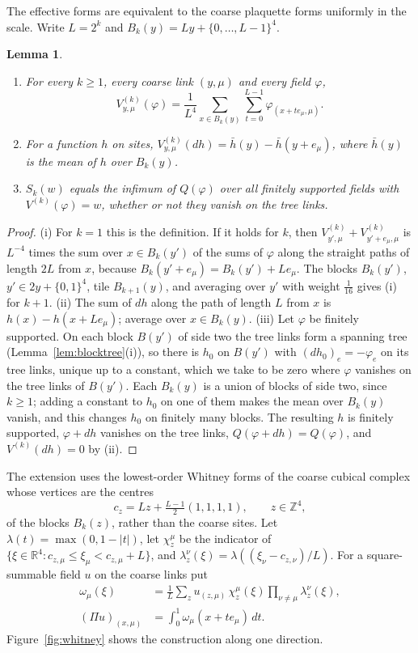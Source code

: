 \documentclass[11pt]{amsart}
\newtheorem{lemma}[theorem]{Lemma}
\theoremstyle{definition}
\theoremstyle{remark}
\numberwithin{equation}{section}
\newcommand{\R}{\mathbb{R}}
\newcommand{\Z}{\mathbb{Z}}
\begin{document}
The effective forms are equivalent to the coarse plaquette forms uniformly
in the scale. Write $L=2^k$ and $B_k(y)=Ly+\{0,\dots,L-1\}^4$.

\begin{lemma}\label{lem:straightpaths}
\begin{enumerate}[label=\textup{(\roman*)},leftmargin=*]
\item For every $k\ge1$, every coarse link $(y,\mu)$ and every field
$\varphi$,
\[
V^{(k)}_{y,\mu}(\varphi)=\frac1{L^4}\sum_{x\in B_k(y)}\sum_{t=0}^{L-1}
\varphi_{(x+te_\mu,\mu)} .
\]
\item For a function $h$ on sites, $V^{(k)}_{y,\mu}(dh)=\bar h(y)-\bar
h(y+e_\mu)$, where $\bar h(y)$ is the mean of $h$ over $B_k(y)$.
\item $S_k(w)$ equals the infimum of $Q(\varphi)$ over all finitely
supported fields with $V^{(k)}(\varphi)=w$, whether or not they vanish on
the tree links.
\end{enumerate}
\end{lemma}

\begin{proof}
(i) For $k=1$ this is the definition. If it holds for $k$, then
$V^{(k)}_{y',\mu}+V^{(k)}_{y'+e_\mu,\mu}$ is $L^{-4}$ times the sum over
$x\in B_k(y')$ of the sums of $\varphi$ along the straight paths of length
$2L$ from $x$, because $B_k(y'+e_\mu)=B_k(y')+Le_\mu$. The blocks $B_k(y')$,
$y'\in2y+\{0,1\}^4$, tile $B_{k+1}(y)$, and averaging over $y'$ with weight
$\frac1{16}$ gives (i) for $k+1$. (ii) The sum of $dh$ along the path of
length $L$ from $x$ is $h(x)-h(x+Le_\mu)$; average over $x\in B_k(y)$.
(iii) Let $\varphi$ be finitely supported. On each block $B(y')$ of side
two the tree links form a spanning tree (Lemma~\ref{lem:blocktree}(i)), so
there is $h_0$ on $B(y')$ with $(dh_0)_e=-\varphi_e$ on its tree links,
unique up to a constant, which we take to be zero where $\varphi$ vanishes
on the tree links of $B(y')$. Each $B_k(y)$ is a union of blocks of side
two, since $k\ge1$; adding a constant to $h_0$ on one of them makes the mean
over $B_k(y)$ vanish, and this changes $h_0$ on finitely many blocks. The
resulting $h$ is finitely supported, $\varphi+dh$ vanishes on the tree
links, $Q(\varphi+dh)=Q(\varphi)$, and $V^{(k)}(dh)=0$ by (ii).
\end{proof}

The extension uses the lowest-order Whitney forms of the coarse cubical
complex whose vertices are the centres
\[
c_z=Lz+\tfrac{L-1}2(1,1,1,1),\qquad z\in\Z^4,
\]
of the blocks $B_k(z)$, rather than the coarse sites. Let $\lambda(t)=\max
(0,1-|t|)$, let $\chi^\mu_z$ be the indicator of $\{\xi\in\R^4:c_{z,\mu}\le
\xi_\mu<c_{z,\mu}+L\}$, and $\lambda^\nu_z(\xi)=\lambda((\xi_\nu-c_{z,\nu})
/L)$. For a square-summable field $u$ on the coarse links put
\[
\begin{split}
\omega_\mu(\xi)&=\frac1L\sum_zu_{(z,\mu)}\,\chi^\mu_z(\xi)\prod_{\nu\ne\mu}
\lambda^\nu_z(\xi),\\
(\Pi u)_{(x,\mu)}&=\int_0^1\omega_\mu(x+te_\mu)\,dt .
\end{split}
\]
Figure~\ref{fig:whitney} shows the construction along one direction.
\end{document}
